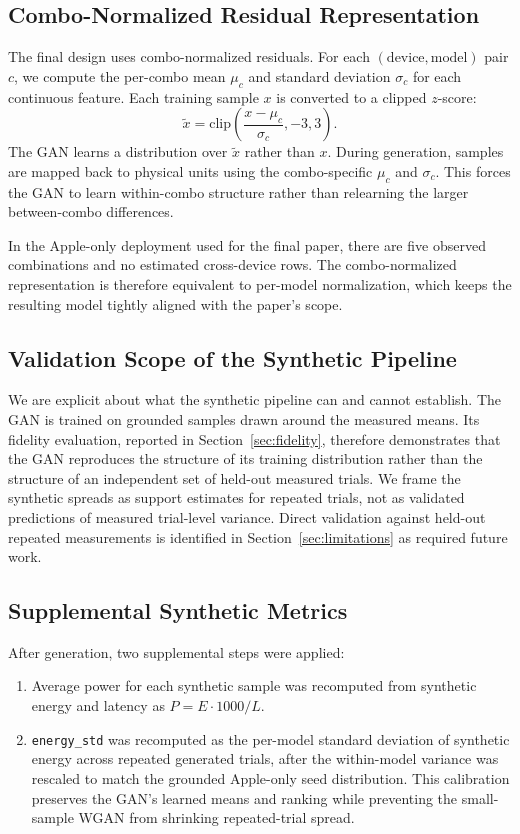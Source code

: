 \documentclass[conference]{IEEEtran}
\begin{document}
\subsection{Combo-Normalized Residual Representation}
The final design uses combo-normalized residuals. For each
$(\text{device}, \text{model})$ pair $c$, we compute the per-combo mean
$\mu_c$ and standard deviation $\sigma_c$ for each continuous feature. Each
training sample $x$ is converted to a clipped $z$-score:
\begin{equation}
\tilde{x} = \mathrm{clip}\!\left(\frac{x - \mu_c}{\sigma_c}, -3, 3\right).
\end{equation}
The GAN learns a distribution over $\tilde{x}$ rather than $x$. During
generation, samples are mapped back to physical units using the combo-specific
$\mu_c$ and $\sigma_c$. This forces the GAN to learn within-combo structure
rather than relearning the larger between-combo differences.

In the Apple-only deployment used for the final paper, there are five observed
combinations and no estimated cross-device rows. The combo-normalized
representation is therefore equivalent to per-model normalization, which keeps
the resulting model tightly aligned with the paper's scope.

\subsection{Validation Scope of the Synthetic Pipeline}
We are explicit about what the synthetic pipeline can and cannot establish.
The GAN is trained on grounded samples drawn around the measured means. Its
fidelity evaluation, reported in Section~\ref{sec:fidelity}, therefore
demonstrates that the GAN reproduces the structure of its training
distribution rather than the structure of an independent set of held-out
measured trials. We frame the synthetic spreads as support estimates for
repeated trials, not as validated predictions of measured trial-level
variance. Direct validation against held-out repeated measurements is
identified in Section~\ref{sec:limitations} as required future work.

\subsection{Supplemental Synthetic Metrics}
After generation, two supplemental steps were applied:
\begin{enumerate}
\item Average power for each synthetic sample was recomputed from synthetic
energy and latency as $P = E \cdot 1000 / L$.
\item \texttt{energy\_std} was recomputed as the per-model standard deviation
of synthetic energy across repeated generated trials, after the within-model
variance was rescaled to match the grounded Apple-only seed distribution. This
calibration preserves the GAN's learned means and ranking while preventing the
small-sample WGAN from shrinking repeated-trial spread.
\end{enumerate}
\end{document}
